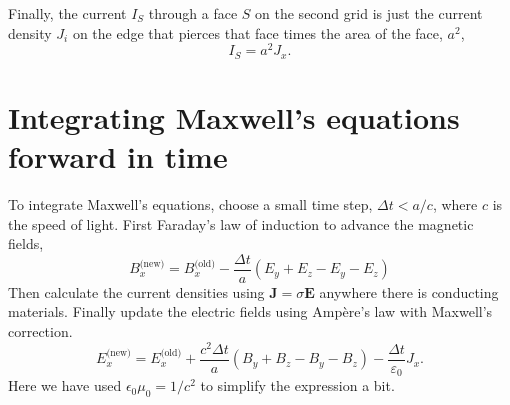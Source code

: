 \documentclass[11pt]{amsart}
\begin{document}
Finally, the current $I_S$ through a face $S$ on the second grid
is just the current density $J_i$ on the edge that pierces that face times
the area of the face, $a^2$,
\begin{equation}
I_S = a^2 J_x.
\end{equation}

\section{Integrating Maxwell's equations forward in time}

To integrate Maxwell's equations, choose a small time step,
$\Delta t < a/c$, where $c$ is the speed of light.
First Faraday's law of induction to advance the magnetic fields,
\begin{equation}
B_x^{\text{(new)}}
=B_x^{\text{(old)}}
-\frac{\Delta t}{a}
(E_y + E_z - E_y -E_z)
\end{equation}
Then calculate the current densities using $\mathbf{J}=\sigma \mathbf{E}$
anywhere there is conducting materials.
Finally update the electric fields using Amp\`ere's law with Maxwell's correction.
\begin{equation}
E_x^{\text{(new)}}
=E_x^{\text{(old)}}
+\frac{c^2 \Delta t}{a}
(B_y + B_z - B_y -B_z)
-\frac{\Delta t}{\varepsilon_0} J_x.
\end{equation}
Here we have used $\epsilon_0\mu_0=1/c^2$ to simplify the expression a bit.
\end{document}
